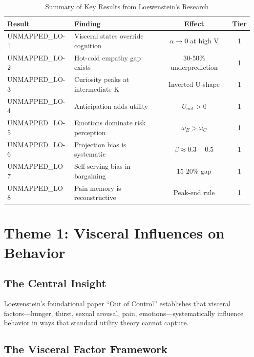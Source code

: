 \begin{table}[htbp]
\centering
\caption{Summary of Key Results from Loewenstein's Research}
\label{tab:lo-key-results}
\renewcommand{\arraystretch}{1.3}
\begin{tabular}{@{}llcc@{}}
\toprule
\textbf{Result} & \textbf{Finding} & \textbf{Effect} & \textbf{Tier} \\
\midrule
UNMAPPED_LO-1 & Visceral states override cognition & $\alpha \to 0$ at high V & 1 \\
UNMAPPED_LO-2 & Hot-cold empathy gap exists & 30-50\% underprediction & 1 \\
UNMAPPED_LO-3 & Curiosity peaks at intermediate K & Inverted U-shape & 1 \\
UNMAPPED_LO-4 & Anticipation adds utility & $U_{ant} > 0$ & 1 \\
UNMAPPED_LO-5 & Emotions dominate risk perception & $\omega_E > \omega_C$ & 1 \\
UNMAPPED_LO-6 & Projection bias is systematic & $\beta \approx 0.3-0.5$ & 1 \\
UNMAPPED_LO-7 & Self-serving bias in bargaining & 15-20\% gap & 1 \\
UNMAPPED_LO-8 & Pain memory is reconstructive & Peak-end rule & 1 \\
\bottomrule
\end{tabular}
\end{table}


\section{Theme 1: Visceral Influences on Behavior}
\label{sec:lo-visceral}

\subsection{The Central Insight}

Loewenstein's foundational paper ``Out of Control'' \citep{loewenstein1996out} establishes that visceral factors---hunger, thirst, sexual arousal, pain, emotions---systematically influence behavior in ways that standard utility theory cannot capture.

\subsection{The Visceral Factor Framework}

